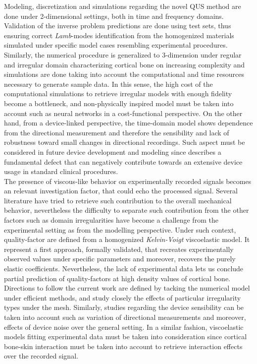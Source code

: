 \begin{conclusion}
Modeling, discretization and simulations regarding the novel QUS method are done under 2-dimensional settings, both in time and frequency domains. Validation of the inverse problem predictions are done using test sets, thus ensuring correct \textit{Lamb}-modes identification from the homogenized materials simulated under specific model cases resembling experimental procedures. Similarly, the numerical procedure is generalized to 3-dimension under regular and irregular domain characterizing cortical bone on increasing complexity and simulations are done taking into account the computational and time resources necessary to generate sample data. In this sense, the high cost of the computational simulations to retrieve irregular models with enough fidelity become a bottleneck, and non-physically inspired model must be taken into account such as neural networks in a cost-functional perspective.
On the other hand, from a device-linked perspective, the time-domain model shows dependence from the directional measurement and therefore the sensibility and lack of robustness toward small changes in directional recordings. Such aspect must be considered in future device development and modeling since describes a fundamental defect that can negatively contribute towards an extensive device usage in standard clinical procedures.
\\

The presence of viscous-like behavior on experimentally recorded signals becomes an relevant investigation factor, that could echo the processed signal. Several literature have tried to retrieve such contribution to the overall mechanical behavior, nevertheless the difficulty to separate such contribution from the other factors such as domain irregularities have become a challenge from the experimental setting as from the modelling perspective. Under such context, quality-factor are defined from a homogenized \textit{Kelvin-Voigt} viscoelastic model. It represent a first approach, formally validated, that recreates experimentally observed values under specific parameters and moreover, recovers the purely elastic coefficients. 
Nevertheless, the lack of experimental data lets us conclude partial prediction of quality-factors at high density values of cortical bone. 
\\

Directions to follow the current work are defined by tacking the numerical model under efficient methods, and study closely the effects of particular irregularity types under the mesh. Similarly, studies regarding the device sensibility can be taken into account such as variation of directional measurements and moreover, effects of device noise over the general setting. 
In a similar fashion, viscoelastic models fitting experimental data must be taken into consideration since cortical bone-skin interaction must be taken into account to retrieve interaction effects over the recorded signal.
\end{conclusion}
